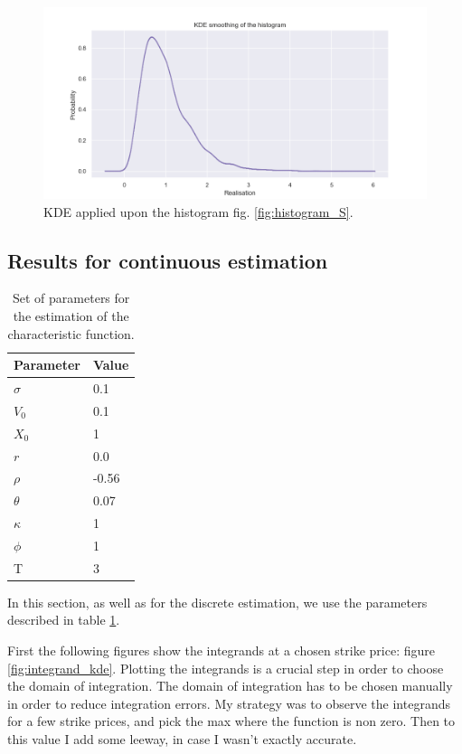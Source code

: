 \begin{figure}
\centering
\includegraphics[width = 0.7 \textwidth]{../addition_part/images/integration_fft/histogram_real_kde.png}
\caption{KDE applied upon the histogram fig. \ref{fig:histogram_S}.}
\label{fig:histogram_S_KDE}
\end{figure}











\subsection{Results for continuous estimation} 

\begin{table}
\begin{center}
\begin{tabular}{   m{4.5 cm} | m{4.5 cm}   } 
\hline
Parameter & Value \\ 
\hline
\hline
$\sigma$ & 0.1  \\
\hline
$V_0$ &  0.1 \\
\hline
$X_0$ &  1 \\
\hline
$r$ & 0.0 \\
\hline
$\rho$ & -0.56 \\
\hline
$\theta$  & 0.07  \\
\hline
$\kappa$ & 1 \\
\hline
$\phi$ & 1  \\
\hline
T & 3 \\
\hline
\end{tabular}
\caption{Set of parameters for the estimation of the characteristic function.}
\label{table:kde}
\end{center}
\end{table}

In this section, as well as for the discrete estimation, we use the parameters described in table \ref{table:kde}.


First the following figures show the integrands at a chosen strike price: figure \ref{fig:integrand_kde}. Plotting the integrands is a crucial step in order to choose the domain of integration. The domain of integration has to be chosen manually in order to reduce integration errors. My strategy was to observe the integrands for a few strike prices, and pick the max where the function is non zero. Then to this value I add some leeway, in case I wasn't exactly accurate.

